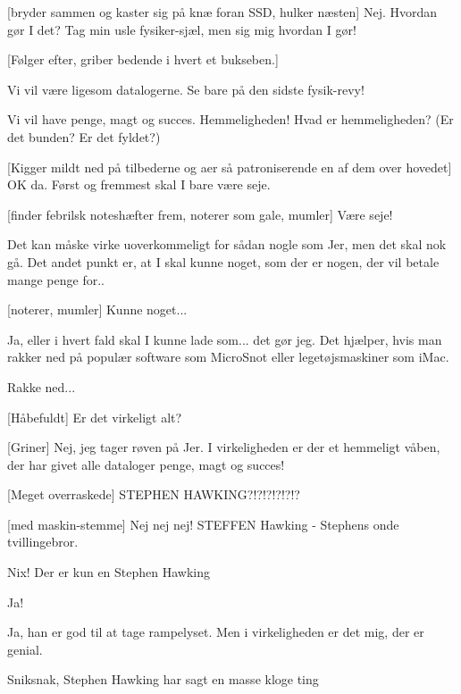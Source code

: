 \documentclass[a4paper,11pt]{article}
\begin{document}
\begin{sketch}
   [bryder sammen og kaster sig på knæ foran SSD, hulker
  næsten] Nej. Hvordan gør I det? Tag min usle fysiker-sjæl, men sig
  mig hvordan I gør!
  
   [Følger efter, griber bedende i hvert et bukseben.]
  
   Vi vil være ligesom datalogerne. Se bare på den sidste fysik-revy!

   Vi vil have penge, magt og succes. Hemmeligheden!
  Hvad er hemmeligheden?  (Er det bunden? Er det fyldet?)
  
   [Kigger mildt ned på tilbederne og aer så patroniserende
  en af dem over hovedet] OK da. Først og fremmest skal I bare være
  seje.
  
   [finder febrilsk noteshæfter frem, noterer som gale,
  mumler] Være seje!
  
   Det kan måske virke uoverkommeligt for sådan nogle som
  Jer, men det skal nok gå. Det andet punkt er, at I skal kunne noget,
  som der er nogen, der vil betale mange penge for..
  
   [noterer, mumler] Kunne noget...
  
   Ja, eller i hvert fald skal I kunne lade som... det gør
  jeg. Det hjælper, hvis man rakker ned på populær software som
  MicroSnot eller legetøjsmaskiner som iMac.
  
   Rakke ned...
  
   [Håbefuldt] Er det virkeligt alt?
  
   [Griner] Nej, jeg tager røven på Jer. I virkeligheden er
  der et hemmeligt våben, der har givet alle dataloger penge, magt og
  succes!
  
  
  
   [Meget overraskede] STEPHEN HAWKING?!?!?!?!?!?
  
   [med maskin-stemme] Nej nej nej! STEFFEN Hawking -
  Stephens onde tvillingebror.
  
   Nix! Der er kun en Stephen Hawking 
  
   Ja!
  
   Ja, han er god til at tage rampelyset. Men i virkeligheden
  er det mig, der er genial.
  
   Sniksnak, Stephen Hawking har sagt en masse kloge ting
  

\end{sketch}
\end{document}
